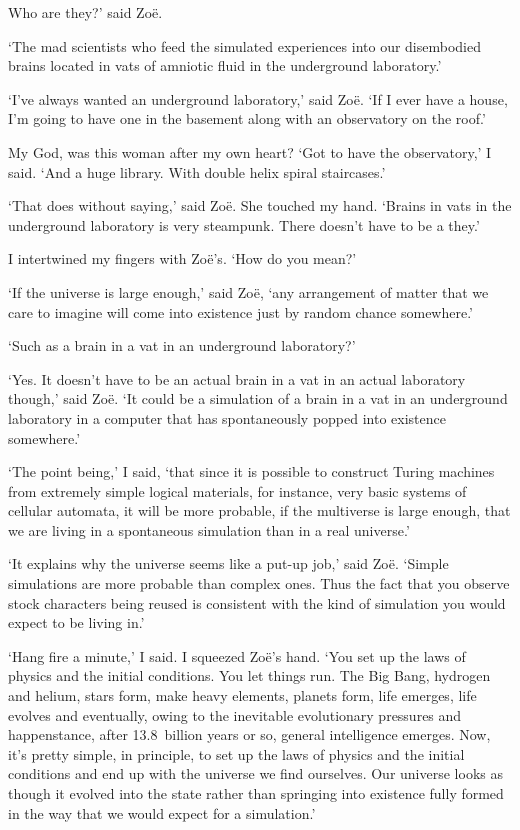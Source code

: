 Who are {\twelveit they\/}?' said Zoë.

`The mad scientists who feed the simulated experiences into our
disembodied brains located in vats of amniotic fluid in the
underground laboratory.'

`I've always wanted an underground laboratory,' said Zoë. `If I
ever have a house, I'm going to have one in the basement along with
an observatory on the roof.'

My God, was this woman after my own heart? `Got to have the
observatory,' I said. `And a huge library. With double helix spiral
staircases.'

`That does without saying,' said Zoë. She touched my hand.
`Brains in vats in the underground laboratory is very steampunk.
There doesn't have to be a {\twelveit they}.'

I intertwined my fingers with Zoë's. `How do you mean?'

`If the universe is large enough,' said Zoë, `any arrangement of
matter that we care to imagine will come into existence just by
random chance somewhere.'

`Such as a brain in a vat in an underground laboratory?'

`Yes. It doesn't have to be an actual brain in a vat in an actual
laboratory though,' said Zoë. `It could be a simulation of a
brain in a vat in an underground laboratory in a computer that has
spontaneously popped into existence somewhere.'

`The point being,' I said, `that since it is possible to construct
Turing machines from extremely simple logical materials, for
instance, very basic systems of cellular automata, it will be more
probable, if the multiverse is large enough, that we are living in a
spontaneous simulation than in a real universe.'

`It explains why the universe seems like a put-up job,' said
Zoë. `Simple simulations are more probable than complex ones.
Thus the fact that you observe stock characters being reused is
consistent with the kind of simulation you would expect to be living
in.'

`Hang fire a minute,' I said. I squeezed Zoë's hand. `You set up
the laws of physics and the initial conditions. You let things run.
The Big Bang, hydrogen and helium, stars form, make heavy elements,
planets form, life emerges, life evolves and eventually, owing to
the inevitable evolutionary pressures and happenstance, after
13.8~billion years or so, general intelligence emerges. Now, it's
pretty simple, in principle, to set up the laws of physics and the
initial conditions and end up with the universe we find ourselves.
Our universe looks as though it evolved into the state rather than
springing into existence fully formed in the way that we would
expect for a simulation.'

